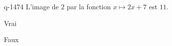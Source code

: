 \begin{truefalse}{q-1474}
L'image de $2$ par la fonction $x\mapsto 2x+7$ est $11$.
\item* Vrai
\item Faux
\end{truefalse}


